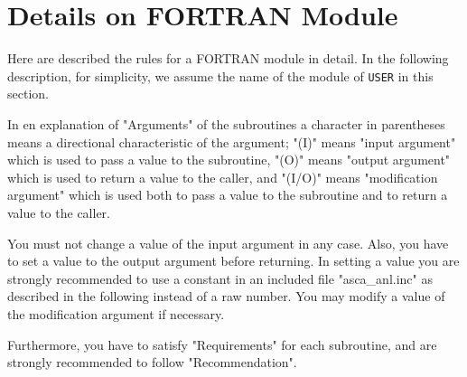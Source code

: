 \chapter{Details on FORTRAN Module}\label{chap:details-on-F}
Here are described the rules for a FORTRAN module in detail.
In the following description,
for simplicity,
we assume the name of the module of {\tt USER} in this section.

In en explanation of "Arguments" of the subroutines
a character in parentheses means
a directional characteristic of the argument;
"(I)" means "input argument"
which is used to pass a value to the subroutine,
"(O)" means "output argument"
which is used to return a value to the caller,
and "(I/O)" means "modification argument"
which is used
both to pass a value to the subroutine
and to return a value to the caller.

You must not change a value of the input argument in any case.
Also,
you have to set a value to the output argument before returning.
In setting a value
you are strongly recommended
to use a constant in an included file "asca\_anl.inc"
as described in the following
instead of a raw number.
You may modify a value of the modification argument if necessary.

Furthermore,
you have to satisfy "Requirements" for each subroutine,
and are strongly recommended to follow "Recommendation".

